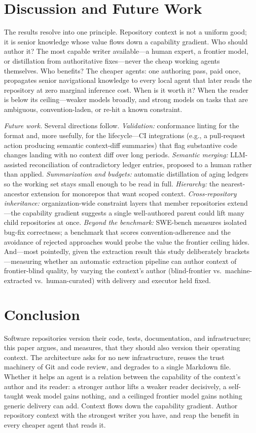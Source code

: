 \documentclass[sigconf,nonacm]{acmart}
\begin{document}
\section{Discussion and Future Work}
The results resolve into one principle. Repository context is not a uniform good;
it is senior knowledge whose value flows down a capability gradient. Who should
author it? The most capable writer available---a human expert, a frontier model,
or distillation from authoritative fixes---never the cheap working agents
themselves. Who benefits? The cheaper agents: one authoring pass, paid once,
propagates senior navigational knowledge to every local agent that later reads the
repository at zero marginal inference cost. When is it worth it? When the reader is
below its ceiling---weaker models broadly, and strong models on tasks that are
ambiguous, convention-laden, or re-hit a known constraint.

\emph{Future work.} Several directions follow. \emph{Validation:} conformance
linting for the format and, more usefully, for the lifecycle---CI integrations
(e.g., a pull-request action producing semantic context-diff summaries) that flag
substantive code changes landing with no context diff over long periods.
\emph{Semantic merging:} LLM-assisted reconciliation of contradictory ledger
entries, proposed to a human rather than applied. \emph{Summarization and
budgets:} automatic distillation of aging ledgers so the working set stays small
enough to be read in full. \emph{Hierarchy:} the nearest-ancestor extension for
monorepos that want scoped context. \emph{Cross-repository inheritance:}
organization-wide constraint layers that member repositories extend---the
capability gradient suggests a single well-authored parent could lift many
child repositories at once. \emph{Beyond the benchmark:} SWE-bench measures
isolated bug-fix correctness; a benchmark that scores convention-adherence and the
avoidance of rejected approaches would probe the value the frontier ceiling hides.
And---most pointedly, given the extraction result this study deliberately
brackets---measuring whether an automatic extraction pipeline can author context
of frontier-blind quality, by varying the context's author (blind-frontier vs.\
machine-extracted vs.\ human-curated) with delivery and executor held fixed.

\section{Conclusion}
Software repositories version their code, tests, documentation, and
infrastructure; this paper argues, and measures, that they should also version
their operating context. The architecture asks for no new infrastructure, reuses
the trust machinery of Git and code review, and degrades to a single Markdown
file. Whether it helps an agent is a relation between the capability of the
context's author and its reader: a stronger author lifts a weaker reader
decisively, a self-taught weak model gains nothing, and a ceilinged frontier model
gains nothing generic delivery can add. Context flows down the capability gradient.
Author repository context with the strongest writer you have, and reap the benefit
in every cheaper agent that reads it.
\end{document}
